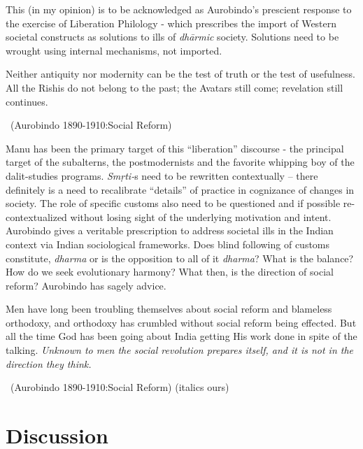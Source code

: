 This (in my opinion) is to be acknowledged as Aurobindo's prescient response to the exercise of Liberation Philology - which prescribes the import of Western societal constructs as solutions to ills of \textit{dhārmic} society. Solutions need to be wrought using internal mechanisms, not imported.

\begin{myquote}
Neither antiquity nor modernity can be the test of truth or the test of usefulness. All the Rishis do not belong to the past; the Avatars still come; revelation still continues. 

~\hfill (Aurobindo 1890-1910:Social Reform)
\end{myquote}

Manu has been the primary target of this “liberation” discourse - the principal target of the subalterns, the postmodernists and the favorite whipping boy of the dalit-studies programs. \textit{Smṛti-}s need to be rewritten contextually – there definitely is a need to recalibrate “details” of practice in cognizance of changes in society. The role of specific customs also need to be questioned and if possible re-contextualized without losing sight of the underlying motivation and intent. Aurobindo gives a veritable prescription to address societal ills in the Indian context via Indian sociological frameworks. Does blind following of customs constitute, \textit{dharma} or is the opposition to all of it \textit{dharma}? What is the balance? How do we seek evolutionary harmony? What then, is the direction of social reform? Aurobindo has sagely advice.

\begin{myquote}
Men have long been troubling themselves about social reform and blameless orthodoxy, and orthodoxy has crumbled without social reform being effected. But all the time God has been going about India getting His work done in spite of the talking. \textit{Unknown to men the social revolution prepares itself, and it is not in the direction they think.} 

~\hfill (Aurobindo 1890-1910:Social Reform) (italics ours)
\end{myquote}


\section*{Discussion}

